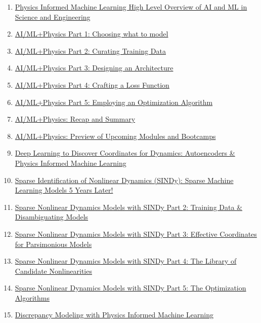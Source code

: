 \documentclass[11pt]{article}
\begin{document}
\begin{enumerate}
	\item  \href{https://mp.weixin.qq.com/s/2ftpAvrKX7JkkVftJ1EdlQ}{Physics Informed Machine Learning High Level Overview of AI and ML in Science and Engineering} %
	\item  \href{https://mp.weixin.qq.com/s/tVVU64Xr30x7RVaR8TXMJg}{AI/ML+Physics Part 1: Choosing what to model} %
	\item  \href{https://mp.weixin.qq.com/s/aKJ9Z-06EdYpIuu0RCtDZg}{AI/ML+Physics Part 2: Curating Training Data} %
	\item  \href{https://mp.weixin.qq.com/s/y8cE9yDz1Yu2hyfmTZVlHw}{AI/ML+Physics Part 3: Designing an Architecture} %
	\item  \href{https://mp.weixin.qq.com/s/TGtUsWgQwXzJ7sM81a-2Jw}{AI/ML+Physics Part 4: Crafting a Loss Function} %
	\item  \href{https://mp.weixin.qq.com/s/Mc8tmdubNkPhBQRbH5EXEQ}{AI/ML+Physics Part 5: Employing an Optimization Algorithm} %
	\item  \href{https://mp.weixin.qq.com/s/ABPfElt5X2cthrbOcX2_XA}{AI/ML+Physics: Recap and Summary} %
	\item  \href{https://mp.weixin.qq.com/s/m2DDlPrg785B4UNhVld7JQ}{AI/ML+Physics: Preview of Upcoming Modules and Bootcamps} %
	\item  \href{https://mp.weixin.qq.com/s/r4CKrNELwXZZTXDjc3P1SQ}{Deep Learning to Discover Coordinates for Dynamics: Autoencoders \& Physics Informed Machine Learning} %
	\item  \href{https://mp.weixin.qq.com/s/c5SBEkD1nHvfGbVt80LOBA}{Sparse Identification of Nonlinear Dynamics (SINDy): Sparse Machine Learning Models 5 Years Later!} %
	\item  \href{https://mp.weixin.qq.com/s/6FRdw-XnLmQ3u4iVnpq41A}{Sparse Nonlinear Dynamics Models with SINDy Part 2: Training Data \& Disambiguating Models} %
	\item  \href{https://mp.weixin.qq.com/s/wLX5Pfiea_M1G2u2NofByg}{Sparse Nonlinear Dynamics Models with SINDy Part 3: Effective Coordinates for Parsimonious Models} %
	\item  \href{https://mp.weixin.qq.com/s/OqG6zxINz5BpZ04FDFyG7g}{Sparse Nonlinear Dynamics Models with SINDy Part 4: The Library of Candidate Nonlinearities} %
	\item  \href{https://mp.weixin.qq.com/s/qObKKUD3RFQGis88ywxWPw}{Sparse Nonlinear Dynamics Models with SINDy Part 5: The Optimization Algorithms} %
	\item  \href{https://mp.weixin.qq.com/s/TlIw-1_yrb0ujKjP84oi6Q}{Discrepancy Modeling with Physics Informed Machine Learning} %

\end{enumerate}
\end{document}
